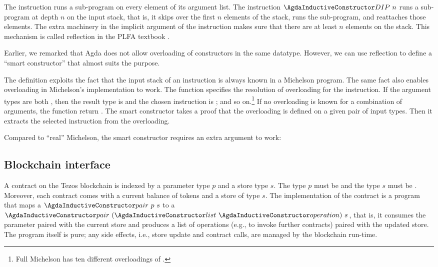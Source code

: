 The instruction  runs a sub-program on every element of its
argument list. The instruction $\ACon{DIP}~n$ runs a sub-program at
depth $n$ on the input stack, that is, it skips over the first $n$
elements of the stack, runs the sub-program, and reattaches those
elements. The extra machinery in the implicit argument of the
instruction makes sure that there are at least $n$ elements on the
stack. This mechanism is called reflection in the  PLFA textbook
\cite{plfa}.

Earlier, we remarked that Agda does not allow overloading of
constructors in the same datatype. However, we can use reflection to
define a ``smart constructor'' that almost suits the purpose.
\SyntaxOverloading

The definition exploits the fact that the input stack of an
instruction is always known in a Michelson program. The same fact also
enables overloading in Michelson's implementation to work.
The function  specifies the resolution of overloading
for the  instruction. If the argument types are both
, then the result type is  and the chosen instruction is
; and so on.\footnote{Full Michelson has ten different
  overloadings of .} If no  overloading is known for a combination
of arguments, the function return .
The smart constructor  takes a proof that the overloading is
defined on a given pair of input types. Then it extracts the selected
instruction from the overloading.

Compared to ``real'' Michelson, the smart constructor requires an
extra argument to work:
\SyntaxOverloadingExample

\subsection{Blockchain interface}
\label{sec:blockchain-interface}

A contract on the Tezos blockchain is indexed by a parameter type $p$
and a store type $s$. The type $p$ must be {\APassable} and the type
$s$ must be {\AStorable}. Moreover, each contract comes with a current
balance of tokens and a store of type $s$. The implementation of the
contract is a program that maps a $\ACon{pair}~p~s$ to a
$\ACon{pair}~(\ACon{list}~\Aoperation)~s$, that is, it consumes the
parameter paired with the current store and produces a list of operations (e.g., to invoke further
contracts) paired with the updated store. The program itself is pure;
any side effects, i.e., store update and contract calls, are managed
by the blockchain run-time.
\ConcreteContract


